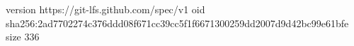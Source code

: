version https://git-lfs.github.com/spec/v1
oid sha256:2ad7702274c376ddd08f671cc39cc5f1f6671300259dd2007d9d42bc99e61bfe
size 336
